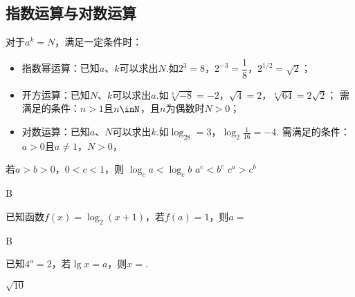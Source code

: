   \subsection{指数运算与对数运算}
    对于$a^k=N$，满足一定条件时：
    \begin{itemize}
      \item {\fangsong 指数幂运算}：已知$a$、$k$可以求出$N$.如$2^3=8$，$2^{-3}=\dfrac18$，$2^{1/2}=\sqrt2$；
      \item {\fangsong 开方运算}：已知$N$、$k$可以求出$a$.如$\sqrt[3]{-8}=-2$，$\sqrt4=2$，$\sqrt[4]{64}=2\sqrt2$；
        需满足的条件：$n>1$且$n\inN$，且$n$为偶数时$N>0$；
      \item {\fangsong 对数运算}：已知$a$、$N$可以求出$k$.如$\log_28=3$，$\log_2{\frac1{16}}=-4$.
        需满足的条件：$a>0$且$a\neq 1$，$N>0$，
    \end{itemize}
    \begin{exercise}
      \item %
        若$a>b>0$，$0<c<1$，则\xz
         {$\log_ca<\log_cb$}
         {$a^c<b^c$}
         {$c^a>c^b$}
        \begin{answer}
          B
        \end{answer}
      \item %
        已知函数$f(x)=\log_2(x+1)$，若$f(a)=1$，则$a=$\xz
        \begin{answer}
          B
        \end{answer}
      \item %
        已知$4^a=2$，若$\lg x=a$，则$x=$\tk.
        \begin{answer}
          $\sqrt{10}$
        \end{answer}
    \end{exercise}
